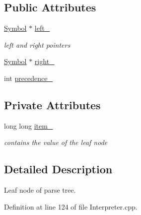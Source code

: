 \subsection*{Public Attributes}
\begin{DoxyCompactItemize}
\item 
\hyperlink{classMadara_1_1Expression__Tree_1_1Symbol}{Symbol} $\ast$ \hyperlink{classMadara_1_1Expression__Tree_1_1Symbol_a7808eb3daad675e2e01409f173a41cee}{left\_\-}
\begin{DoxyCompactList}\small\item\em left and right pointers \item\end{DoxyCompactList}\item 
\hyperlink{classMadara_1_1Expression__Tree_1_1Symbol}{Symbol} $\ast$ \hyperlink{classMadara_1_1Expression__Tree_1_1Symbol_a13467d1c78fbf06c3d64a6a4770eee7a}{right\_\-}
\item 
int \hyperlink{classMadara_1_1Expression__Tree_1_1Symbol_a2de31139261eea47dccd48d377780803}{precedence\_\-}
\end{DoxyCompactItemize}
\subsection*{Private Attributes}
\begin{DoxyCompactItemize}
\item 
long long \hyperlink{classMadara_1_1Expression__Tree_1_1Number_a6b4fec641bcdbd6bba02fc3334644a05}{item\_\-}
\begin{DoxyCompactList}\small\item\em contains the value of the leaf node \item\end{DoxyCompactList}\end{DoxyCompactItemize}


\subsection{Detailed Description}
Leaf node of parse tree. 

Definition at line 124 of file Interpreter.cpp.



